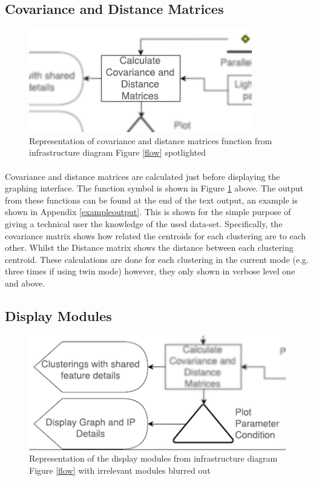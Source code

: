 \subsection{Covariance and Distance Matrices}
\label{infra5}

\begin{figure}[!h]
\centering
\includegraphics{./Figures/cov.png}
\caption{Representation of covariance and distance matrices function from infrastructure diagram Figure \ref{flow} spotlighted}
\label{cov}
\end{figure}

\paragraph{}Covariance and distance matrices are calculated just before displaying the graphing interface. The function symbol is shown in Figure \ref{cov} above. The output from these functions can be found at the end of the text output, an example is shown in Appendix \ref{exampleoutput}. This is shown for the simple purpose of giving a technical user the knowledge of the used data-set. Specifically, the covariance matrix shows how related the centroids for each clustering are to each other. Whilst the Distance matrix shows the distance between each clustering centroid. These calculations are done for each clustering in the current mode (e.g. three times if using twin mode) however, they only shown in verbose level one and above.

\subsection{Display Modules}
\label{infra6}

\begin{figure}[!h]
\centering
\includegraphics{./Figures/display.png}
\caption{Representation of the display modules from infrastructure diagram Figure \ref{flow} with irrelevant modules blurred out}
\label{display}
\end{figure}



